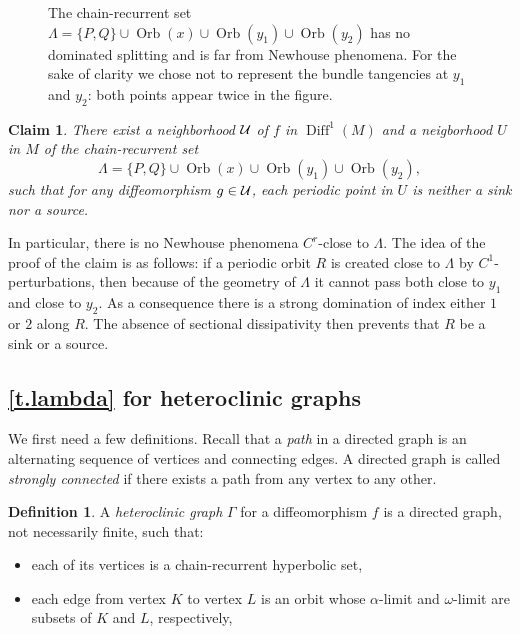 \documentclass[11pt, a4paper]{amsart}
\theoremstyle{plain}
\newtheorem{claim}{Claim}[section]
\theoremstyle{definition}
\newtheorem{definition}{Definition}[proposition]
\theoremstyle{remark}
\numberwithin{equation}{section}         %
\DeclareMathOperator{\Diff}{{Diff}}
\def\Diff{\operatorname{Diff}}
\def\Orb{\operatorname{Orb}}
\begin{document}
 \begin{figure}%
\begin{center}
\def\svgwidth{200pt}           %

\end{center}
\caption{\small The chain-recurrent set $\Lambda=\{P,Q\}\cup \Orb(x)\cup \Orb(y_1)\cup \Orb(y_2)$ has no dominated splitting and is far from Newhouse phenomena. For the sake of clarity we chose not to represent the bundle tangencies at $y_1$ and $y_2$: both points appear twice in the figure.}
\label{f.counterex2}
\end{figure} 


\begin{claim}
There exist a neighborhood ${\mathcal U}$ of $f$ in $\Diff^1(M)$ and a neigborhood $U$ in $M$ of the chain-recurrent set
$$\Lambda=\{P,Q\}\cup \Orb(x)\cup \Orb(y_1)\cup \Orb(y_2),$$ such that for any diffeomorphism $g\in {\mathcal U}$, each periodic point in $U$ is neither a sink nor a source. 
\end{claim}

In particular, there is no Newhouse phenomena $C^r$-close to $\Lambda$.
The idea of the proof of the claim is as follows: if a periodic orbit $R$ is created close to $\Lambda$ by $C^1$-perturbations, then because of the geometry of $\Lambda$ it cannot pass both close to $y_1$ and close to $y_2$. As a consequence there is a strong domination of index either $1$ or $2$ along $R$. The absence of sectional dissipativity then prevents that $R$ be a sink or a source.
 


 
\subsection{\cref{t.lambda} for heteroclinic graphs}\label{s.newph}

We first need a few definitions. Recall that a {\em path} in a directed graph is an alternating sequence of vertices and connecting edges. A directed graph is called {\em strongly connected} if there exists a path from any vertex to any other.

\begin{definition}
A {\em heteroclinic graph} $\Gamma$ for a diffeomorphism $f$ is a directed graph, not necessarily finite, such that:
\begin{itemize}
\item each of its vertices is a chain-recurrent hyperbolic set,
\item each edge from vertex $K$ to vertex $L$ is an orbit whose $\alpha$-limit and $\omega$-limit are subsets of $K$ and $L$, respectively,
\end{itemize}
\end{definition}
\end{document}
